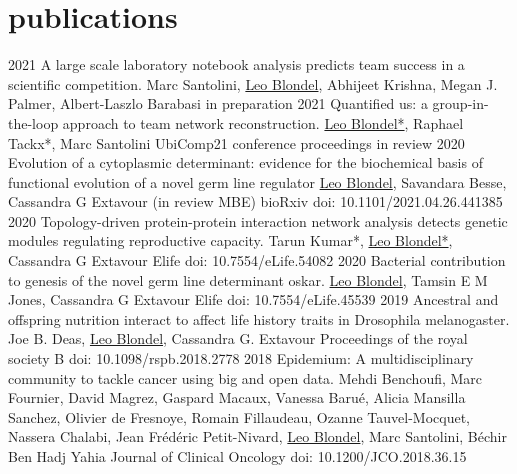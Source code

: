 \documentclass[]{twentysecondcv}
\begin{document}
\section{publications}

\begin{twentyshort}
  \twentyitemcite
    {2021}
    {A large scale laboratory notebook analysis predicts team success in a scientific competition.}
    {Marc Santolini, \underline{Leo Blondel}, Abhijeet Krishna, Megan J. Palmer, Albert-Laszlo Barabasi}
    {}
    {in preparation}
  \twentyitemcite
    {2021}
    {Quantified us: a group-in-the-loop approach to team network reconstruction.}
    {\underline{Leo Blondel*}, Raphael Tackx*, Marc Santolini}
    {UbiComp21 conference proceedings}
    {in review}
  \twentyitemcite
    {2020}
    {Evolution of a cytoplasmic determinant: evidence for the biochemical basis of functional evolution of a novel germ line regulator}
    {\underline{Leo Blondel}, Savandara Besse, Cassandra G Extavour}
    {(in review MBE)}
    {bioRxiv doi: 10.1101/2021.04.26.441385}
  \twentyitemcite
    {2020}
    {Topology-driven protein-protein interaction network analysis detects genetic modules regulating reproductive capacity.}
    {Tarun Kumar*, \underline{Leo Blondel*}, Cassandra G Extavour}
    {Elife}
    {doi: 10.7554/eLife.54082}
  \twentyitemcite
    {2020}
    {Bacterial contribution to genesis of the novel germ line determinant oskar.}
    {\underline{Leo Blondel}, Tamsin E M Jones, Cassandra G Extavour}
    {Elife}
    {doi: 10.7554/eLife.45539}
  \twentyitemcite
    {2019}
    {Ancestral and offspring nutrition interact to affect life history traits in Drosophila melanogaster.}
    {Joe B. Deas, \underline{Leo Blondel}, Cassandra G. Extavour}
	{Proceedings of the royal society B}
    {doi: 10.1098/rspb.2018.2778}
  \twentyitemcite
    {2018}
    {Epidemium: A multidisciplinary community to tackle cancer using big and open data.}
    {Mehdi Benchoufi, Marc Fournier, David Magrez, Gaspard Macaux, Vanessa Barué, Alicia Mansilla Sanchez, Olivier de Fresnoye, Romain Fillaudeau, Ozanne Tauvel-Mocquet, Nassera Chalabi, Jean Frédéric Petit-Nivard, \underline{Leo Blondel}, Marc Santolini, Béchir Ben Hadj Yahia}
	{Journal of Clinical Oncology}
    {doi: 10.1200/JCO.2018.36.15}
\end{twentyshort}

\newpage{}
\end{document}
